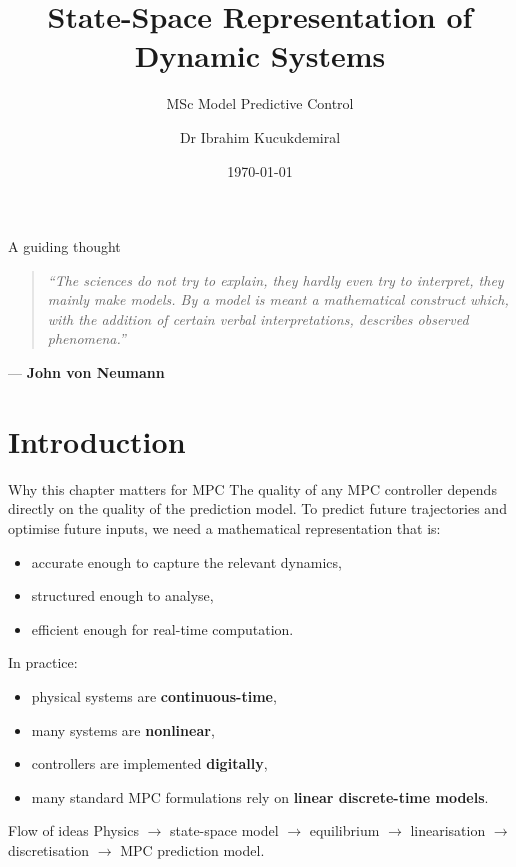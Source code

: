 \documentclass[aspectratio=169,10pt]{beamer}
\title[State-Space Representation]{State-Space Representation of Dynamic Systems}
\subtitle{MSc Model Predictive Control}
\author{Dr Ibrahim Kucukdemiral}
\institute{Glasgow Caledonian University}
\date{\today}
\begin{document}
\begin{frame}
\titlepage
\end{frame}

\begin{frame}{A guiding thought}
\begin{quote}
\itshape
``The sciences do not try to explain, they hardly even try to interpret, they mainly make models.
By a model is meant a mathematical construct which, with the addition of certain verbal interpretations,
describes observed phenomena.''
\end{quote}
\hfill --- \textbf{John von Neumann}
\end{frame}

\section{Introduction}

\begin{frame}{Why this chapter matters for MPC}
The quality of any MPC controller depends directly on the quality of the prediction model.
To predict future trajectories and optimise future inputs, we need a mathematical representation that is:
\begin{itemize}
  \item accurate enough to capture the relevant dynamics,
  \item structured enough to analyse,
  \item efficient enough for real-time computation.
\end{itemize}

In practice:
\begin{itemize}
  \item physical systems are \textbf{continuous-time},
  \item many systems are \textbf{nonlinear},
  \item controllers are implemented \textbf{digitally},
  \item many standard MPC formulations rely on \textbf{linear discrete-time models}.
\end{itemize}

\begin{notebox}{Flow of ideas}
Physics \(\rightarrow\) state-space model \(\rightarrow\) equilibrium \(\rightarrow\) linearisation \(\rightarrow\) discretisation \(\rightarrow\) MPC prediction model.
\end{notebox}
\end{frame}
\end{document}
